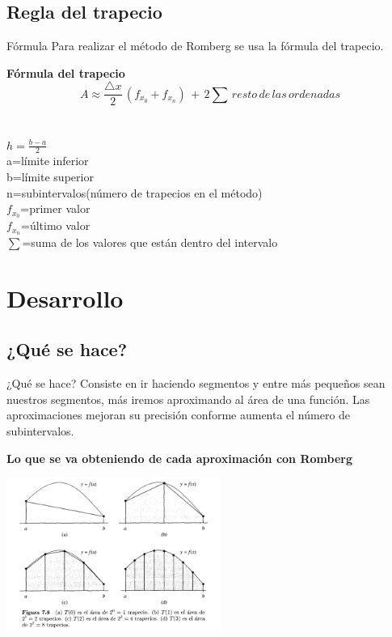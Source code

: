 \documentclass{beamer}
\begin{document}
\subsection{Regla del trapecio}
    \begin{frame}{Fórmula}
Para realizar el método de Romberg se usa la fórmula del trapecio.
\begin{alertblock} 
    {\centering\bf Fórmula del trapecio}
        \[A\approx\frac{\triangle x}{2}\,\left(f_{x_{0}}+f_{x_{n}}\right)\,+\,2\sum\, resto\, de\, las\, ordenadas\]\\
        \\
        {$h=\frac{b-a}{2}$}\\
        a=límite inferior\\
        b=límite superior\\
        n=subintervalos(número de trapecios en el método)\\
        $f_{x_{0}}$=primer valor\\
        $f_{x_{n}}$=último valor\\
        $\sum$=suma de los valores que están dentro del intervalo
        \end{alertblock}
\end{frame}

\section{Desarrollo}
  \subsection{¿Qué se hace?}
        \begin{frame}{¿Qué se hace?}
Consiste en ir haciendo segmentos y entre más pequeños sean nuestros segmentos, más iremos aproximando al área de una función. Las aproximaciones mejoran su precisión conforme aumenta el número de subintervalos.
  \begin{alertblock}{\centering \bf Lo que se va obteniendo de cada aproximación con Romberg} 
	\begin{center}
		\includegraphics[height=5cm]{fig1.png}
    \end{center}
\end{alertblock}
\end{frame}
\end{document}
